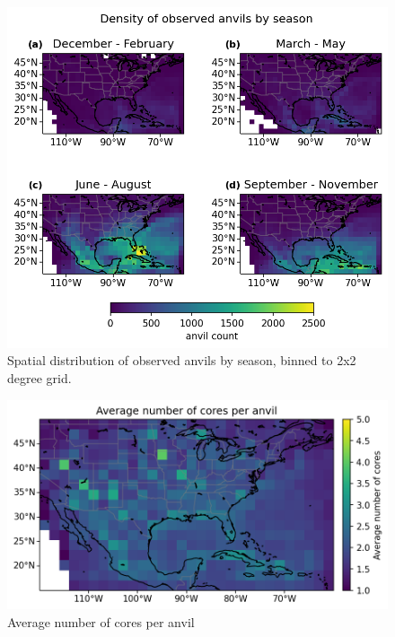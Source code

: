 \begin{figure}[tp]
    \centering
    \includegraphics[width=\textwidth]{figures/ch2_12.png}
    \caption{Spatial distribution of observed anvils by season, binned to 2x2 degree grid.}
    \label{fig:anvil_distribution_map}
\end{figure}

\begin{figure}[tp]
    \centering
    \includegraphics[width=\textwidth]{figures/ch2_13.png}
    \caption{Average number of cores per anvil}
    \label{fig:anvil_number_of_cores_map}
\end{figure}

